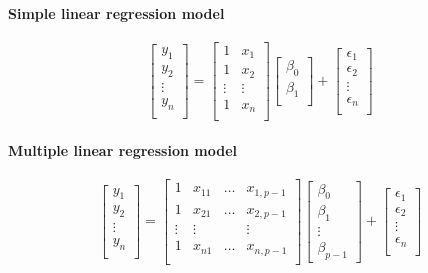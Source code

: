 \paragraph{Simple linear regression model}
$$
\left[ \begin{array}{c} y_1\\ y_2 \\ \vdots \\ y_n\\ \end{array} \right] =
\left[ \begin{array}{cc} 1   &x_1\\ 1 & x_2 \\ \vdots & \vdots \\ 1 & x_n\\ \end{array} \right] \left[ \begin{array}{c} \beta_0\\ \beta_1 \\ \end{array} \right] +
\left[ \begin{array}{c} \epsilon_1\\ \epsilon_2 \\ \vdots \\ \epsilon_n\\ \end{array} \right]
$$

\paragraph{Multiple linear regression model}
$$
\left[ \begin{array}{c} y_1\\ y_2 \\ \vdots \\ y_n\\ \end{array} \right] =
\left[ \begin{array}{cccc} 1   &x_{11} & \dots & x_{1,p - 1}\\ 1 & x_{21} & \dots & x_{2, p-1} \\ \vdots & \vdots & & \vdots \\ 1 & x_{n1} & \dots & x_{n, p-1}\\ \end{array} \right] \left[ \begin{array}{c} \beta_0\\ \beta_1 \\ \vdots\\ \beta_{p - 1} \end{array} \right] +
\left[ \begin{array}{c} \epsilon_1\\ \epsilon_2 \\ \vdots \\ \epsilon_n\\ \end{array} \right]
$$


